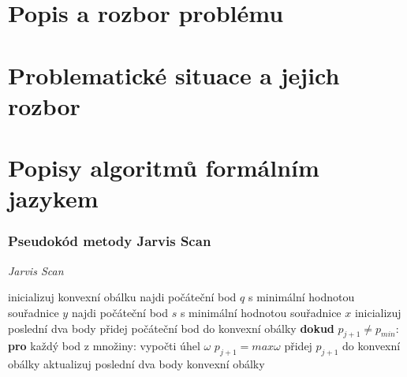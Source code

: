 \documentclass[15pt]{article}
\begin{document}
\begin{spacing}{1.5}
\begin{center}
\begin{tabular}{|l|l|}
\end{tabular}
\end{center}



\newpage
\section*{Popis a rozbor problému}































\newpage
\section*{Problematické situace a jejich rozbor}

\newpage
\section*{Popisy algoritmů formálním jazykem}

\subsubsection*{Pseudokód metody Jarvis Scan}
    \begin{algorithm}
        \caption {\textit{Jarvis Scan}}
        \begin{algorithmic}[1]
            \State inicializuj konvexní obálku
            \State najdi počáteční bod $q$ s minimální hodnotou souřadnice $y$ 
            \State najdi počáteční bod $s$ s minimální hodnotou souřadnice $x$
            \State inicializuj poslední dva body
            \State přidej počáteční bod do konvexní obálky
            \State \textbf{dokud} $p_{j+1} \neq p_{min}$:
            \State \indent \textbf{pro} každý bod z množiny:
            \State \indent \indent vypočti úhel $\omega$
            \State \indent \indent $p_{j+1} = max \omega$
            \State \indent \indent přidej $p_{j+1}$ do konvexní obálky
            \State \indent \indent aktualizuj poslední dva body konvexní obálky
        \end{algorithmic}
    \end{algorithm}


\end{spacing}
\end{document}
